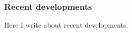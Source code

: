 \subsubsection{Recent developments}
\label{sub:recent_developments}

Here I write about recent developments.